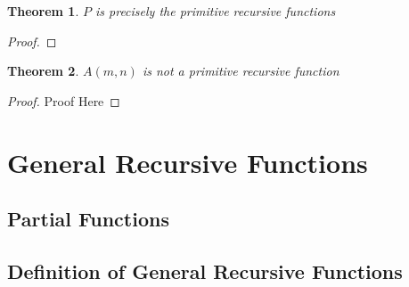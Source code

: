 \documentclass[12pt, letterpaper]{article}
\newtheorem{theorem}{Theorem}
\begin{document}
    \begin{theorem}
      $P$ is precisely the primitive recursive functions
    \end{theorem}
    \begin{proof}
    \end{proof}

    \begin{theorem}
      $A(m, n)$ is not a primitive recursive function
    \end{theorem}
    \begin{proof}
      Proof Here
    \end{proof}


  \section{General Recursive Functions}
    \subsection{Partial Functions}
    \subsection{Definition of General Recursive Functions}
\end{document}
